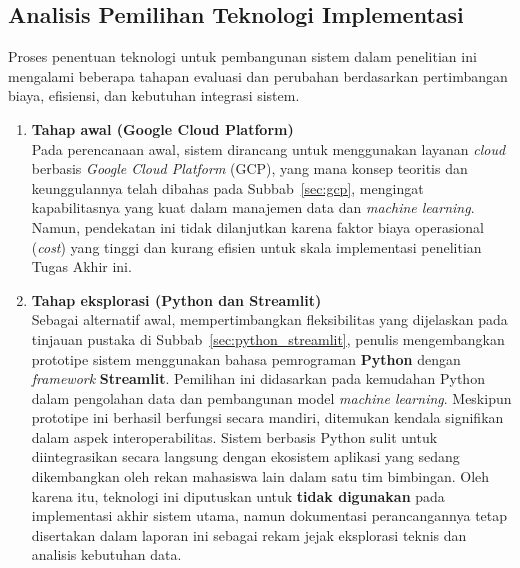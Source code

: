 \subsection{Analisis Pemilihan Teknologi Implementasi}

Proses penentuan teknologi untuk pembangunan sistem dalam penelitian ini mengalami beberapa tahapan evaluasi dan perubahan berdasarkan pertimbangan biaya, efisiensi, dan kebutuhan integrasi sistem.

\begin{enumerate}
    \item \textbf{Tahap awal (Google Cloud Platform)} \\
    Pada perencanaan awal, sistem dirancang untuk menggunakan layanan \textit{cloud} berbasis \textit{Google Cloud Platform} (GCP), yang mana konsep teoritis dan keunggulannya telah dibahas pada Subbab~\ref{sec:gcp}, mengingat kapabilitasnya yang kuat dalam manajemen data dan \textit{machine learning}. Namun, pendekatan ini tidak dilanjutkan karena faktor biaya operasional (\textit{cost}) yang tinggi dan kurang efisien untuk skala implementasi penelitian Tugas Akhir ini.

    \item \textbf{Tahap eksplorasi (Python dan Streamlit)} \\
    Sebagai alternatif awal, mempertimbangkan fleksibilitas yang dijelaskan pada tinjauan pustaka di Subbab~\ref{sec:python_streamlit}, penulis mengembangkan prototipe sistem menggunakan bahasa pemrograman \textbf{Python} dengan \textit{framework} \textbf{Streamlit}. Pemilihan ini didasarkan pada kemudahan Python dalam pengolahan data dan pembangunan model \textit{machine learning}. Meskipun prototipe ini berhasil berfungsi secara mandiri, ditemukan kendala signifikan dalam aspek interoperabilitas. Sistem berbasis Python sulit untuk diintegrasikan secara langsung dengan ekosistem aplikasi yang sedang dikembangkan oleh rekan mahasiswa lain dalam satu tim bimbingan. Oleh karena itu, teknologi ini diputuskan untuk \textbf{tidak digunakan} pada implementasi akhir sistem utama, namun dokumentasi perancangannya tetap disertakan dalam laporan ini sebagai rekam jejak eksplorasi teknis dan analisis kebutuhan data.


\end{enumerate}
